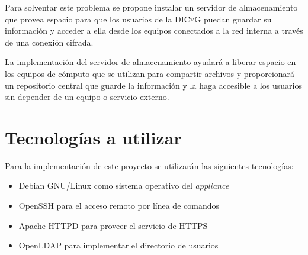 Para solventar este problema se propone instalar un servidor de almacenamiento que provea espacio para que los usuarios de la \textsc{DICyG} puedan guardar su informaci\'{o}n y acceder a ella desde los equipos conectados a la red interna a trav\'{e}s de una conexi\'{o}n cifrada.

La implementaci\'{o}n del servidor de almacenamiento ayudar\'{a} a liberar espacio en los equipos de c\'{o}mputo que se utilizan para compartir archivos y proporcionar\'{a} un repositorio central que guarde la informaci\'{o}n y la haga accesible a los usuarios sin depender de un equipo o servicio externo.


    \section {Tecnolog\'{i}as a utilizar}

Para la implementaci\'{o}n de este proyecto se utilizar\'{a}n las siguientes tecnolog\'{i}as:

\begin{itemize}
  \item Debian GNU/Linux como sistema operativo del \textit{appliance}
  \item OpenSSH para el acceso remoto por l\'{i}nea de comandos
  \item Apache HTTPD para proveer el servicio de \textsc{\gls{HTTPS}}
  \item OpenLDAP para implementar el directorio de usuarios
\end{itemize}

